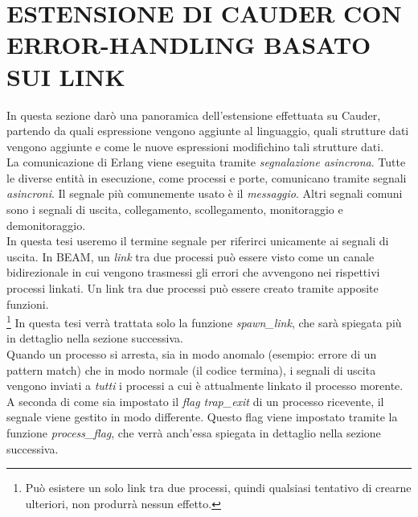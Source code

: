 \documentclass[Tesi.tex]{subfiles}
\begin{document}
\section{ESTENSIONE DI CAUDER CON ERROR-HANDLING BASATO SUI LINK}
In questa sezione darò una panoramica dell'estensione effettuata su Cauder, partendo da quali espressione vengono aggiunte al linguaggio, quali strutture dati vengono aggiunte e come le nuove espressioni modifichino tali strutture dati.\\
La comunicazione di Erlang viene eseguita tramite \textit{segnalazione asincrona}. Tutte le diverse entità in esecuzione, come processi e porte, comunicano tramite segnali \textit{asincroni}\cite{erlangCommunication}.
Il segnale più comunemente usato è il \textit{messaggio}. Altri segnali comuni sono i segnali di uscita, collegamento, scollegamento, monitoraggio e demonitoraggio.\\
In questa tesi useremo il termine segnale per riferirci unicamente ai segnali di uscita.
In BEAM, un \textit{link} \cite{erlangLinks} tra due processi può essere visto come un canale bidirezionale in cui vengono trasmessi gli errori che avvengono nei rispettivi processi linkati.
Un link tra due processi può essere creato tramite apposite funzioni.\\
\footnote{Può esistere un solo link tra due processi, quindi qualsiasi tentativo di crearne ulteriori, non produrrà nessun effetto.}
In questa tesi verrà trattata solo la funzione \textit{spawn\_link}, che sarà spiegata più in dettaglio nella sezione successiva.\\
Quando un processo si arresta, sia in modo anomalo (esempio: errore di un pattern match) che in modo normale (il codice termina), i segnali di uscita vengono inviati a \textit{tutti} i processi a cui è attualmente linkato il processo morente.
A seconda di come sia impostato il \textit{flag trap\_exit} di un processo ricevente, il segnale viene gestito in modo differente. Questo flag viene impostato tramite la funzione \textit{process\_flag}, che verrà anch'essa spiegata in dettaglio nella sezione successiva.

\end{document}
